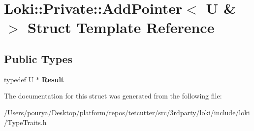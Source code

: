 \hypertarget{structLoki_1_1Private_1_1AddPointer_3_01U_01_6_01_4}{}\section{Loki\+:\+:Private\+:\+:Add\+Pointer$<$ U \& $>$ Struct Template Reference}
\label{structLoki_1_1Private_1_1AddPointer_3_01U_01_6_01_4}
\subsection*{Public Types}
\begin{DoxyCompactItemize}
\item 
\hypertarget{structLoki_1_1Private_1_1AddPointer_3_01U_01_6_01_4_a7b0f75890e15b89ca16373febf6653d8}{}typedef U $\ast$ {\bfseries Result}\label{structLoki_1_1Private_1_1AddPointer_3_01U_01_6_01_4_a7b0f75890e15b89ca16373febf6653d8}

\end{DoxyCompactItemize}


The documentation for this struct was generated from the following file\+:\begin{DoxyCompactItemize}
\item 
/\+Users/pourya/\+Desktop/platform/repos/tetcutter/src/3rdparty/loki/include/loki/Type\+Traits.\+h\end{DoxyCompactItemize}
